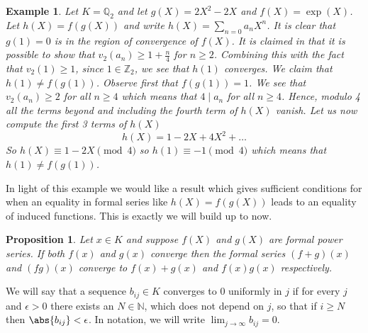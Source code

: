\documentclass{article}
\newtheorem{proposition}{Proposition}[section]
\newtheorem{example}{Example}[section]
\newcommand{\mbb}[1]{\mathbb{#1}}
\numberwithin{equation}{section}
\begin{document}
\begin{example}\label{ex: h(X) != f(g(X))}
    Let $K = \mbb Q_2$ and let $g(X) = 2X^2 - 2X$ and $f(X) = \exp(X)$. Let $h(X) = f(g(X))$ and write $h(X) = \sum_{n = 0}a_n X^n$. It is clear that $g(1) = 0$ is in the region of convergence of $f(X)$. It is claimed in \citep[Problem 162]{gouvea} that it is possible to show that $v_2(a_n) \geq 1 + \frac{n}{4}$ for $n \geq 2$. Combining this with the fact that $v_2(1) \geq 1$, since $1 \in \mbb Z_2$, we see that $h(1)$ converges. We claim that $h(1) \neq f(g(1))$. Observe first that $f(g(1))= 1$. We see that $v_2(a_n) \geq 2$ for all $n \geq 4$ which means that $4 \mid a_n$ for all $n \geq 4$. Hence, modulo 4 all the terms beyond and including the fourth term of $h(X)$ vanish. Let us now compute the first 3 terms of $h(X)$ 
    $$h(X) = 1 - 2X + 4X^2 + \ldots$$
    So $h(X) \equiv 1 - 2X \pmod {4}$ so $h(1) \equiv -1 \pmod {4}$ which means that $h(1) \neq f(g(1))$.
\end{example}
In light of this example we would like a result which gives sufficient conditions for when an equality in formal series like $h(X) = f(g(X))$ leads to an equality of induced functions. This is exactly we will build up to now. 

\begin{proposition}\label{prop: Convergence of sum and product of power series}
    Let $x \in K$ and suppose $f(X)$ and $g(X)$ are formal power series. If both $f(x)$ and $g(x)$ converge then the formal series $(f+g)(x)$ and $(fg)(x)$ converge to $f(x) + g(x)$ and $f(x)g(x)$ respectively.
\end{proposition}
    




We will say that a sequence $b_{ij} \in K$ converges to 0 uniformly in $j$ if for every $j$ and $\epsilon > 0$ there exists an $N \in \mbb N$, which does not depend on $j$, so that if $i \geq N$ then $\abs{b_{ij}} < \epsilon$. In notation, we will write $\lim_{j \to \infty}b_{ij} = 0$.
\end{document}
